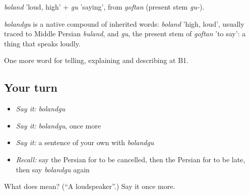 \emph{boland} 'loud, high' + \emph{gu} 'saying', from \emph{goftan} (present stem \emph{gu-}).

\begin{cousinweb}
\emph{bolandgu} is a native compound of inherited words: \emph{boland} 'high, loud', usually traced to Middle Persian \emph{buland}, and \emph{gu}, the present stem of \emph{goftan} 'to say': a thing that speaks loudly.
\end{cousinweb}

\begin{grammarlens}[title={What you've built}]
One more word for telling, explaining and describing at B1.
\end{grammarlens}

\subsection*{Your turn}
\begin{itemize}
\raggedright
  \item \emph{Say it:} \emph{bolandgu}
  \item \emph{Say it:} \emph{bolandgu}, once more
  \item \emph{Say it:} a sentence of your own with \emph{bolandgu}
  \item \emph{Recall:} say the Persian for to be cancelled, then the Persian for to be late, then say \emph{bolandgu} again
\end{itemize}

\begin{tcolorbox}[breakable,colback=teal!4,colframe=teal!35!black,title={Before you move on}]
What does  mean? (\textquotedblleft{}A loudspeaker\textquotedblright{}.) Say it once more.
\end{tcolorbox}
